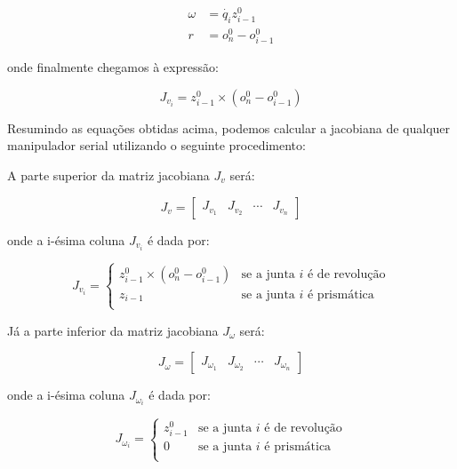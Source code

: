 \begin{align*}
    \omega & = \dot{q_i} z_{i-1}^0 \\
    r      & = o_n^0 - o_{i-1}^0
\end{align*}

onde finalmente chegamos à expressão:

\begin{equation}
    J_{v_i} = z_{i-1}^0 \times (o_n^0 - o_{i-1}^0)
\end{equation}

Resumindo as equações obtidas acima, podemos calcular a jacobiana de qualquer
manipulador serial utilizando o seguinte procedimento:

A parte superior da matriz jacobiana \(J_v\) será:

\begin{equation}
    J_v = \begin{bmatrix}
        J_{v_1} & J_{v_2} & \cdots & J_{v_n}
    \end{bmatrix}
\end{equation}

onde a i-ésima coluna \(J_{v_i}\) é dada por:

\begin{equation}
    J_{v_i} =
    \begin{cases}
        z_{i-1}^0 \times (o_n^0 - o_{i-1}^0) & \text{se a junta $i$ é de revolução} \\
        z_{i-1}                              & \text{se a junta $i$ é prismática}   \\
    \end{cases}
\end{equation}

Já a parte inferior da matriz jacobiana \(J_\omega\) será:

\begin{equation}
    J_\omega = \begin{bmatrix}
        J_{\omega_1} & J_{\omega_2} & \cdots & J_{\omega_n}
    \end{bmatrix}
\end{equation}

onde a i-ésima coluna \(J_{\omega_i}\) é dada por:

\begin{equation}
    J_{\omega_i} =
    \begin{cases}
        z_{i-1}^0 & \text{se a junta $i$ é de revolução} \\
        0         & \text{se a junta $i$ é prismática}   \\
    \end{cases}
\end{equation}

